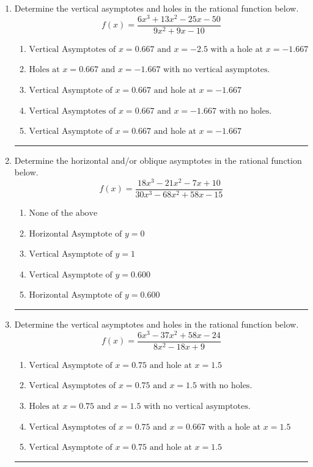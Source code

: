 \documentclass[14pt]{extbook}
\newcommand{\litem}[1]{\item#1\hspace*{-1cm}\rule{\textwidth}{0.4pt}}
\begin{document}
\begin{enumerate}
{\begin{enumerate}[label=\Alph*.]
\end{enumerate} }
\litem{
Determine the vertical asymptotes and holes in the rational function below.\[ f(x) = \frac{6x^{3} +13 x^{2} -25 x -50}{9x^{2} +9 x -10} \]\begin{enumerate}[label=\Alph*.]
\item \( \text{Vertical Asymptotes of } x = 0.667 \text{ and } x = -2.5 \text{ with a hole at } x = -1.667 \)
\item \( \text{Holes at } x = 0.667 \text{ and } x = -1.667 \text{ with no vertical asymptotes.} \)
\item \( \text{Vertical Asymptote of } x = 0.667 \text{ and hole at } x = -1.667 \)
\item \( \text{Vertical Asymptotes of } x = 0.667 \text{ and } x = -1.667 \text{ with no holes.} \)
\item \( \text{Vertical Asymptote of } x = 0.667 \text{ and hole at } x = -1.667 \)

\end{enumerate} }
\litem{
Determine the horizontal and/or oblique asymptotes in the rational function below.\[ f(x) = \frac{18x^{3} -21 x^{2} -7 x + 10}{30x^{3} -68 x^{2} +58 x -15} \]\begin{enumerate}[label=\Alph*.]
\item \( \text{None of the above} \)
\item \( \text{Horizontal Asymptote of } y = 0  \)
\item \( \text{Vertical Asymptote of } y = 1  \)
\item \( \text{Vertical Asymptote of } y = 0.600  \)
\item \( \text{Horizontal Asymptote of } y = 0.600  \)

\end{enumerate} }
\litem{
Determine the vertical asymptotes and holes in the rational function below.\[ f(x) = \frac{6x^{3} -37 x^{2} +58 x -24}{8x^{2} -18 x + 9} \]\begin{enumerate}[label=\Alph*.]
\item \( \text{Vertical Asymptote of } x = 0.75 \text{ and hole at } x = 1.5 \)
\item \( \text{Vertical Asymptotes of } x = 0.75 \text{ and } x = 1.5 \text{ with no holes.} \)
\item \( \text{Holes at } x = 0.75 \text{ and } x = 1.5 \text{ with no vertical asymptotes.} \)
\item \( \text{Vertical Asymptotes of } x = 0.75 \text{ and } x = 0.667 \text{ with a hole at } x = 1.5 \)
\item \( \text{Vertical Asymptote of } x = 0.75 \text{ and hole at } x = 1.5 \)

\end{enumerate} }
\end{enumerate}
\end{document}
